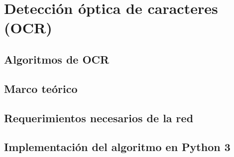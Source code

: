 \chapter{Detección óptica de caracteres (OCR)}

\section{Algoritmos de OCR}

\section{Marco teórico}

\section{Requerimientos necesarios de la red}

\section{Implementación del algoritmo en Python 3}
